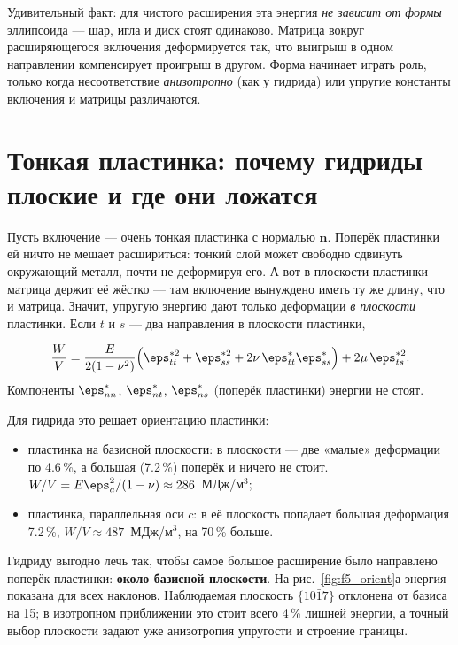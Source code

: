 \begin{idea}
Удивительный факт: для чистого расширения эта энергия \emph{не зависит от формы} эллипсоида --- шар, игла и диск
стоят одинаково. Матрица вокруг расширяющегося включения деформируется так, что выигрыш в одном направлении
компенсирует проигрыш в другом. Форма начинает играть роль, только когда несоответствие \emph{анизотропно} (как у
гидрида) или упругие константы включения и матрицы различаются.
\end{idea}

\section{Тонкая пластинка: почему гидриды плоские и где они ложатся}

Пусть включение --- очень тонкая пластинка с нормалью $\mathbf n$. Поперёк пластинки ей ничто не мешает
расшириться: тонкий слой может свободно сдвинуть окружающий металл, почти не деформируя его. А вот в плоскости
пластинки матрица держит её жёстко --- там включение вынуждено иметь ту же длину, что и матрица. Значит,
упругую энергию дают только деформации \emph{в плоскости} пластинки. Если $t$ и $s$ --- два направления в плоскости
пластинки,
\begin{keyf}
\[
\frac{W}{V} = \frac{E}{2(1-\nu^2)}\Bigl(\eps^{*2}_{tt} + \eps^{*2}_{ss} + 2\nu\,\eps^*_{tt}\eps^*_{ss}\Bigr) + 2\mu\,\eps^{*2}_{ts} .
\]
Компоненты $\eps^*_{nn}$, $\eps^*_{nt}$, $\eps^*_{ns}$ (поперёк пластинки) энергии не стоят.
\end{keyf}

Для гидрида это решает ориентацию пластинки:
\begin{itemize}
\item пластинка на базисной плоскости: в плоскости --- две «малые» деформации по 4.6\,\%, а большая (7.2\,\%)
  поперёк и ничего не стоит. $W/V = E\eps_a^2/(1-\nu) \approx 286$~МДж/м$^3$;
\item пластинка, параллельная оси $c$: в её плоскость попадает большая деформация 7.2\,\%,
  $W/V\approx 487$~МДж/м$^3$, на 70\,\% больше.
\end{itemize}
Гидриду выгодно лечь так, чтобы самое большое расширение было направлено поперёк пластинки: \textbf{около
базисной плоскости}. На рис.~\ref{fig:f5_orient}а энергия показана для всех наклонов. Наблюдаемая плоскость
$\{10\bar17\}$ отклонена от базиса на 15\textdegree; в изотропном приближении это стоит всего 4\,\% лишней энергии,
а точный выбор плоскости задают уже анизотропия упругости и строение границы.


